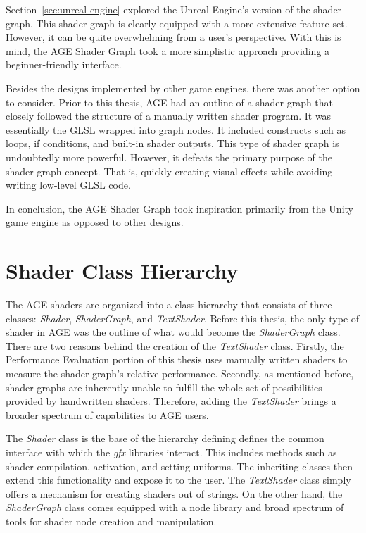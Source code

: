 \documentclass[
  digital,     %
  oneside,     %
  nosansbold,  %
  nocolorbold, %
  lof,         %
  lot,         %
]{fithesis4}
\begin{document}
Section~\ref{sec:unreal-engine} explored the Unreal Engine's version of the shader graph.
This shader graph is clearly equipped with a more extensive feature set. However, it can be
quite overwhelming from a user's perspective. With this is mind, the AGE Shader Graph
took a more simplistic approach providing a beginner-friendly interface.

Besides the designs implemented by other game engines, there was another option to consider.
Prior to this thesis, AGE had an outline
of a shader graph that closely followed the structure of a manually written shader program.
It was essentially the GLSL wrapped into graph nodes. It included constructs
such as loops, if conditions, and built-in shader outputs. This type of shader graph
is undoubtedly more powerful. However, it defeats the primary purpose of the shader graph concept.
That is, quickly creating visual effects while avoiding writing low-level GLSL code.

In conclusion, the AGE Shader Graph took inspiration primarily from the Unity game engine
as opposed to other designs.

\section{Shader Class Hierarchy}
The AGE shaders are organized into a class hierarchy that consists of three classes: \textit{Shader},
\textit{ShaderGraph}, and \textit{TextShader}. Before this thesis, the only type of shader in AGE
was the outline of what would become the \textit{ShaderGraph} class. There are two reasons
behind the creation of the \textit{TextShader} class. Firstly, the Performance Evaluation
portion of this thesis uses manually written shaders to measure the shader graph's relative performance.
Secondly, as mentioned before, shader graphs are inherently
unable to fulfill the whole set of possibilities provided by handwritten shaders. Therefore,
adding the \textit{TextShader} brings a broader spectrum of capabilities to AGE users.

The \textit{Shader} class is the base of the hierarchy defining defines the common interface
with which the \textit{gfx} libraries interact. This includes methods such as shader compilation,
activation, and setting uniforms. The inheriting classes then extend this functionality
and expose it to the user. The \textit{TextShader} class simply offers a mechanism for creating
shaders out of strings. On the other hand, the \textit{ShaderGraph} class comes equipped
with a node library and broad spectrum of tools for shader node creation and manipulation.
\end{document}
